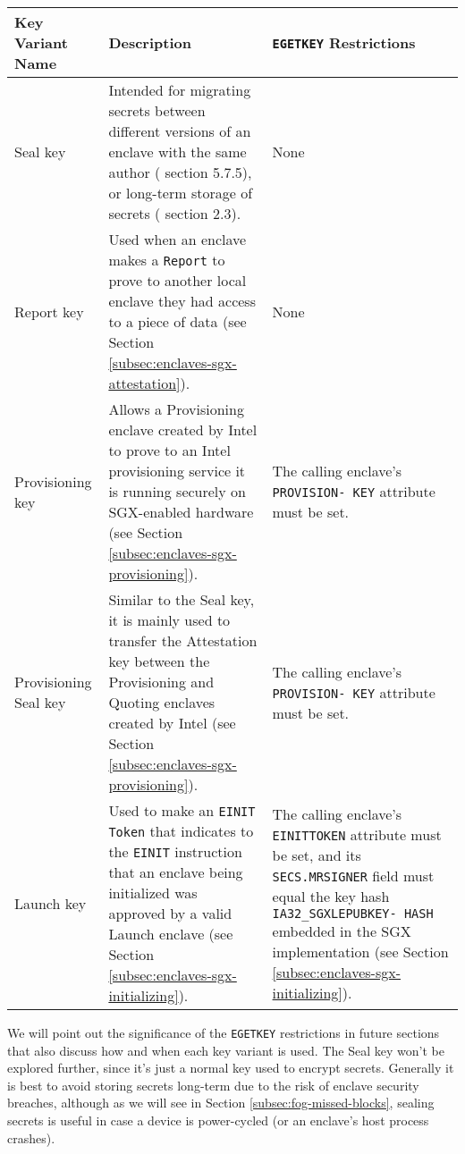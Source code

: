 \begin{tabularx}{\textwidth}{|l|X|X|}
\caption{SGX Key Variants}
\label{table:sgx-key-variants}\\
\hline
    Key Variant Name &
    Description &
    {\tt EGETKEY} Restrictions\\
\hline\hline
    Seal key &
    Intended for migrating secrets between different versions of an enclave with the same author (\cite{intel-sgx-explained-advanced} section 5.7.5), or long-term storage of secrets (\cite{sgx-epid-provisioning-attestation} section 2.3). &
    None \\
\hline
    Report key &
    Used when an enclave makes a {\tt Report} to prove to another local enclave they had access to a piece of data (see Section \ref{subsec:enclaves-sgx-attestation}). &
    None \\
\hline
    Provisioning key &
    Allows a Provisioning enclave created by Intel to prove to an Intel provisioning service it is running securely on SGX-enabled hardware (see Section \ref{subsec:enclaves-sgx-provisioning}). &
    The calling enclave's {\tt PROVISION- KEY} attribute must be set. \\
\hline
    Provisioning Seal key &
    Similar to the Seal key, it is mainly used to transfer the Attestation key between the Provisioning and Quoting enclaves created by Intel (see Section \ref{subsec:enclaves-sgx-provisioning}). &
    The calling enclave's {\tt PROVISION- KEY} attribute must be set. \\
\hline
    Launch key &
    Used to make an {\tt EINIT Token} that indicates to the {\tt EINIT} instruction that an enclave being initialized was approved by a valid Launch enclave (see Section \ref{subsec:enclaves-sgx-initializing}). &
    The calling enclave's {\tt EINITTOKEN} attribute must be set, and its {\tt SECS.MRSIGNER} field must equal the key hash {\tt IA32\_SGXLEPUBKEY- HASH} embedded in the SGX implementation (see Section \ref{subsec:enclaves-sgx-initializing}).\\
\hline
\end{tabularx}

We will point out the significance of the {\tt EGETKEY} restrictions in future sections that also discuss how and when each key variant is used. The Seal key won't be explored further, since it's just a normal key used to encrypt secrets. Generally it is best to avoid storing secrets long-term due to the risk of enclave security breaches, although as we will see in Section \ref{subsec:fog-missed-blocks}, sealing secrets is useful in case a device is power-cycled (or an enclave's host process crashes).

